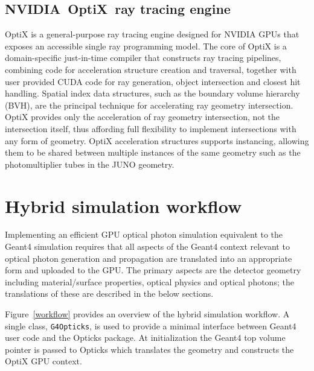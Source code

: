 \documentclass{webofc}
\begin{document}
\subsection{NVIDIA\textregistered\ OptiX\texttrademark\ ray tracing engine}
%
OptiX is a general-purpose ray tracing engine
designed for NVIDIA GPUs that exposes an accessible single ray programming model.
The core of OptiX is a domain-specific just-in-time compiler that constructs 
ray tracing pipelines, combining code for acceleration structure creation and traversal, 
together with user provided CUDA code for ray generation, object intersection and closest hit handling.
Spatial index data structures, such as the boundary volume hierarchy (BVH), are the 
principal technique for accelerating ray geometry intersection.  
OptiX provides only the acceleration of ray geometry intersection, not the intersection itself,
thus affording full flexibility to implement intersections with any form of geometry. 
OptiX acceleration structures supports instancing, allowing them to be shared 
between multiple instances of the same geometry such as the photomultiplier tubes in the JUNO geometry.  
%
%

\section{Hybrid simulation workflow}
\label{secworkflow}
%
Implementing an efficient GPU optical photon simulation equivalent to the Geant4 simulation 
requires that all aspects of the Geant4 context relevant to optical photon generation and 
propagation are translated into an appropriate form and uploaded to the GPU. 
The primary aspects are the detector geometry including material/surface properties, optical physics and optical photons; 
the translations of these are described in the below sections.

Figure~\ref{workflow} provides an overview of the hybrid simulation workflow. 
A single class, {\tt G4Opticks}, is used to provide a 
minimal interface between Geant4 user code and 
the Opticks package. 
At initialization the Geant4 top volume pointer is
passed to Opticks which translates the geometry and constructs 
the OptiX GPU context.
\end{document}
